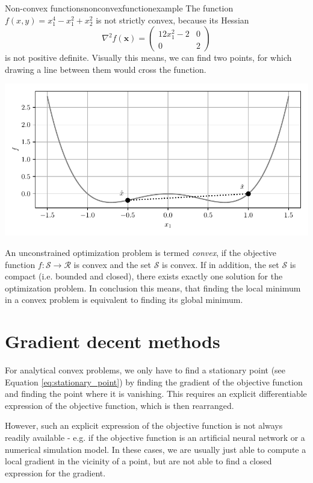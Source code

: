 \begin{example}{Non-convex functions}{nonconvexfunctionexample}
    The function $f(x, y)=x_1^4-x_1^2+x_2^2$ is not strictly convex, because its Hessian 
    \begin{equation}
        \nabla^2f(\mathbf{x}) = 
        \begin{pmatrix}
        12x_1^2-2 & 0 \\ 
        0       & 2         
        \end{pmatrix}
    \end{equation} 
    is not positive definite. Visually this means, we can find two points, for which drawing a line between them would cross the function. 
    
    \includegraphics[width=\textwidth]{figures/convex_function_1.pdf}
\end{example}

An unconstrained optimization problem is termed \emph{convex}, if the objective function $f: \mathcal{S} \rightarrow \mathcal{R}$ is convex and the set $\mathcal{S}$ is convex. If in addition, the set $\mathcal{S}$ is compact (i.e. bounded and closed), there exists exactly one solution for the optimization problem. In conclusion this means, that finding the local minimum in a convex problem is equivalent to finding its global minimum. 

\section{Gradient decent methods}
For analytical convex problems, we only have to find a stationary point (see Equation \ref{eq:stationary_point}) by finding the gradient of the objective function and finding the point where it is vanishing. This requires an explicit differentiable expression of the objective function, which is then rearranged.

However, such an explicit expression of the objective function is not always readily available - e.g. if the objective function is an artificial neural network or a numerical simulation model. In these cases, we are usually just able to compute a local gradient in the vicinity of a point, but are not able to find a closed expression for the gradient. 

